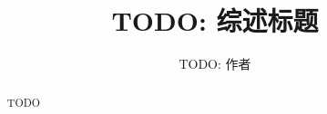 \documentclass[11pt]{ctexart}
\title{TODO: 综述标题}
\author{TODO: 作者}
\date{}
\begin{document}
\maketitle

\begin{abstract}
TODO
\end{abstract}

% 
% 
% 
% 
% 
% 
% 
% 

\clearpage


\end{document}
